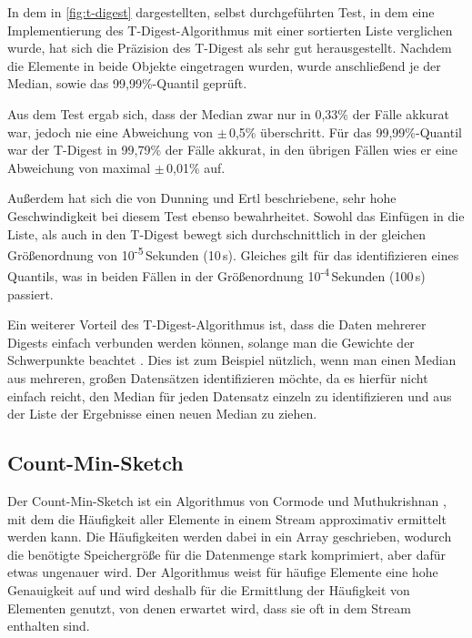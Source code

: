 In dem in \autoref{fig:t-digest} dargestellten, selbst durchgeführten Test, in dem eine Implementierung des T-Digest-Algorithmus mit einer sortierten Liste verglichen wurde, hat sich die Präzision des T-Digest als sehr gut herausgestellt.
Nachdem die Elemente in beide Objekte eingetragen wurden, wurde anschließend je der Median, sowie das 99,99\%-Quantil geprüft.

Aus dem Test ergab sich, dass der Median zwar nur in 0,33\% der Fälle akkurat war, jedoch nie eine Abweichung von $\pm$\,0,5\% überschritt.
Für das 99,99\%-Quantil war der T-Digest in 99,79\% der Fälle akkurat, in den übrigen Fällen wies er eine Abweichung von maximal $\pm$\,0,01\% auf.

Außerdem hat sich die von Dunning und Ertl \cite{dunning2019} beschriebene, sehr hohe Geschwindigkeit bei diesem Test ebenso bewahrheitet.
Sowohl das Einfügen in die Liste, als auch in den T-Digest bewegt sich durchschnittlich in der gleichen Größenordnung von 10\textsuperscript{-5}\,Sekunden (10\,\textmu{}s).
Gleiches gilt für das identifizieren eines Quantils, was in beiden Fällen in der Größenordnung 10\textsuperscript{-4}\,Sekunden (100\,\textmu{}s) passiert.

Ein weiterer Vorteil des T-Digest-Algorithmus ist, dass die Daten mehrerer Digests einfach verbunden werden können, solange man die Gewichte der Schwerpunkte beachtet \cite{dunning2019}.
Dies ist zum Beispiel nützlich, wenn man einen Median aus mehreren, großen Datensätzen identifizieren möchte, da es hierfür nicht einfach reicht, den Median für jeden Datensatz einzeln zu identifizieren und aus der Liste der Ergebnisse einen neuen Median zu ziehen.


\subsection{Count-Min-Sketch}

Der Count-Min-Sketch ist ein Algorithmus von Cormode und Muthukrishnan \cite{cormode2005}, 
mit dem die Häufigkeit aller Elemente in einem Stream approximativ ermittelt werden kann. 
Die Häufigkeiten werden dabei in ein Array geschrieben, 
wodurch die benötigte Speichergröße für die Datenmenge stark komprimiert, 
aber dafür etwas ungenauer wird. 
Der Algorithmus weist für häufige Elemente eine hohe Genauigkeit auf 
und wird deshalb für die Ermittlung der Häufigkeit von Elementen genutzt, 
von denen erwartet wird, dass sie oft in dem Stream enthalten sind.

